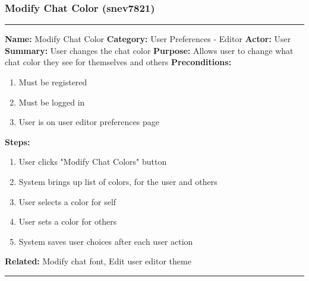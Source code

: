 \documentclass[11pt]{report}
\begin{document}
\subsubsection{Modify Chat Color (snev7821)}
\vspace{2pt}
\hrule
\vspace{8pt}
	\noindent\textbf{Name:} Modify Chat Color \newline
	\textbf{Category:} User Preferences - Editor  \newline
	\textbf{Actor:} User \newline
	\textbf{Summary:} User changes the chat color \newline
	\textbf{Purpose:} Allows user to change what chat color they see for themselves and others \newline
	\textbf{Preconditions:}
	\begin{enumerate}
		\item Must be registered
		\item Must be logged in
		\item User is on user editor preferences page
	\end{enumerate}
	\textbf{Steps:}
	\begin{enumerate}
		\item User clicks "Modify Chat Colors" button
		\item System brings up list of colors, for the user and others
		\item User selects a color for self
		\item User sets a color for others
		\item System saves user choices after each user action
	\end{enumerate}
	\textbf{Related:} Modify chat font, Edit user editor theme
\vspace{8pt}
\hrule
\newpage
\end{document}

